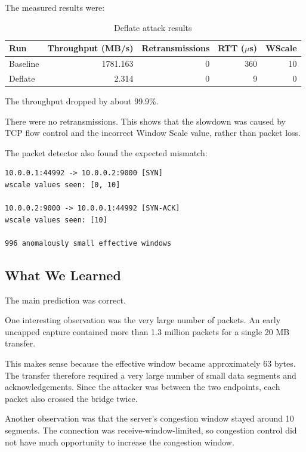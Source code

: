 \documentclass[11pt]{article}
\begin{document}
The measured results were:

\begin{table}[h]
\centering
\begin{tabular}{lrrrr}
\toprule
Run & Throughput (MB/s) & Retransmissions & RTT ($\mu$s) & WScale \\
\midrule
Baseline & 1781.163 & 0 & 360 & 10 \\
Deflate  & 2.314    & 0 & 9   & 0 \\
\bottomrule
\end{tabular}
\caption{Deflate attack results}
\end{table}

The throughput dropped by about 99.9\%.

There were no retransmissions. This shows that the slowdown was caused
by TCP flow control and the incorrect Window Scale value, rather than
packet loss.

The packet detector also found the expected mismatch:

\begin{lstlisting}
10.0.0.1:44992 -> 10.0.0.2:9000 [SYN]
wscale values seen: [0, 10]

10.0.0.2:9000 -> 10.0.0.1:44992 [SYN-ACK]
wscale values seen: [10]

996 anomalously small effective windows
\end{lstlisting}

\subsection{What We Learned}

The main prediction was correct.

One interesting observation was the very large number of packets.
An early uncapped capture contained more than 1.3 million packets
for a single 20 MB transfer.

This makes sense because the effective window became approximately
63 bytes. The transfer therefore required a very large number of
small data segments and acknowledgements. Since the attacker was
between the two endpoints, each packet also crossed the bridge twice.

Another observation was that the server's congestion window stayed
around 10 segments. The connection was receive-window-limited, so
congestion control did not have much opportunity to increase the
congestion window.

\end{document}

